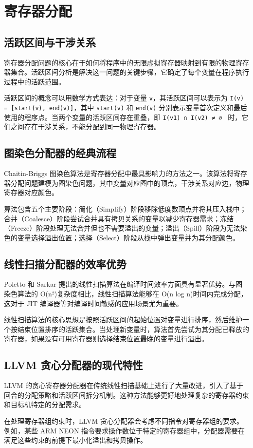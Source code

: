 \chapter{寄存器分配}
\section{活跃区间与干涉关系}
寄存器分配问题的核心在于如何将程序中的无限虚拟寄存器映射到有限的物理寄存器集合。活跃区间分析是解决这一问题的关键步骤，它确定了每个变量在程序执行过程中的活跃范围。\par
活跃区间的概念可以用数学方式表达：对于变量 \texttt{v}，其活跃区间可以表示为 \texttt{I(v) = [start(v), end(v)]}，其中 \texttt{start(v)} 和 \texttt{end(v)} 分别表示变量首次定义和最后使用的程序点。当两个变量的活跃区间存在重叠，即 \texttt{I(v1) ∩ I(v2) ≠ ∅ } 时，它们之间存在干涉关系，不能分配到同一物理寄存器。\par
\section{图染色分配器的经典流程}
Chaitin-Briggs 图染色算法是寄存器分配中最具影响力的方法之一。该算法将寄存器分配问题建模为图染色问题，其中变量对应图中的顶点，干涉关系对应边，物理寄存器对应颜色。\par
算法包含五个主要阶段：简化（Simplify）阶段移除低度数顶点并将其压入栈中；合并（Coalesce）阶段尝试合并具有拷贝关系的变量以减少寄存器需求；冻结（Freeze）阶段处理无法合并但也不需要溢出的变量；溢出（Spill）阶段为无法染色的变量选择溢出位置；选择（Select）阶段从栈中弹出变量并为其分配颜色。\par
\section{线性扫描分配器的效率优势}
Poletto 和 Sarkar 提出的线性扫描算法在编译时间效率方面具有显著优势。与图染色算法的 O(n²)复杂度相比，线性扫描算法能够在 O(n log n)时间内完成分配，这对于 JIT 编译器等对编译时间敏感的应用场景尤为重要。\par
线性扫描算法的核心思想是按照活跃区间的起始位置对变量进行排序，然后维护一个按结束位置排序的活跃集合。当处理新变量时，算法首先尝试为其分配已释放的寄存器，如果没有可用寄存器则选择结束位置最晚的变量进行溢出。\par
\section{LLVM 贪心分配器的现代特性}
LLVM 的贪心寄存器分配器在传统线性扫描基础上进行了大量改进，引入了基于回合的分配策略和活跃区间拆分机制。这种方法能够更好地处理复杂的寄存器约束和目标机特定的分配需求。\par
在处理寄存器组约束时，LLVM 贪心分配器会考虑不同指令对寄存器组的要求。例如，某些 ARM NEON 指令要求操作数位于特定的寄存器组中，分配器需要在满足这些约束的前提下最小化溢出和拷贝操作。\par
